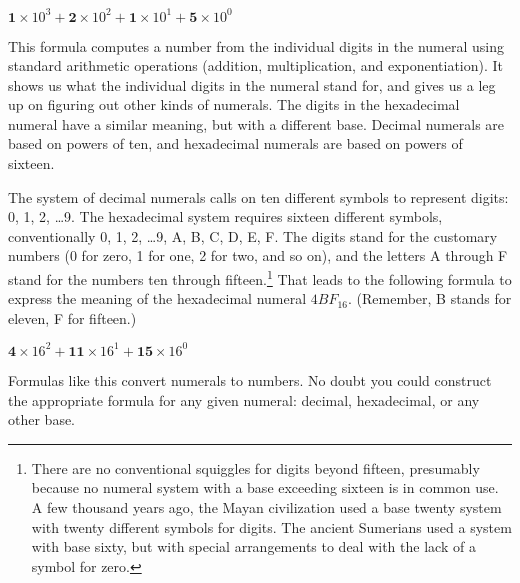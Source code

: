 \begin{center}
$\textbf{1} \times 10^3 + \textbf{2} \times 10^2 + \textbf{1} \times 10^1 + \textbf{5} \times 10^0$
\end{center}

This formula computes a number from the individual digits
in the numeral using standard arithmetic operations
(addition, multiplication, and exponentiation).
It shows us what the individual digits in the numeral stand for,
and gives us a leg up on figuring out other kinds of numerals.
The digits in the hexadecimal numeral have a similar meaning,
but with a different base. Decimal numerals are based on
powers of ten, and hexadecimal numerals are based on powers of sixteen.

The system of decimal numerals calls on ten different symbols to represent digits:
0, 1, 2, \dots 9.
The hexadecimal system requires sixteen different symbols, conventionally
0, 1, 2, \dots 9, A, B, C, D, E, F.
The digits stand for the customary numbers
(0 for zero, 1 for one, 2 for two, and so on),
and the letters A through F
stand for the numbers ten through fifteen.\footnote{There
are no conventional squiggles for digits beyond fifteen,
presumably because no numeral system
with a base exceeding sixteen is in common use.
A few thousand years ago, the Mayan civilization used a base twenty system
with twenty different symbols for digits.
The ancient Sumerians used a system with base sixty,
but with special arrangements to deal with the lack of a symbol for zero.}
That leads to the following
formula to express the meaning of the hexadecimal numeral $4BF_{16}$.
(Remember, B stands for eleven, F for fifteen.)
\begin{center}
$\textbf{4} \times 16^2 + \textbf{11} \times 16^1 + \textbf{15} \times 16^0$
\end{center}
Formulas like this
convert numerals to numbers.
No doubt you could construct the appropriate formula
for any given numeral: decimal, hexadecimal, or any other base.

